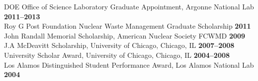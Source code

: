 \documentclass[margin,line]{resume}
\begin{document}
\begin{resume}
                DOE Office of Science Laboratory Graduate Appointment, Argonne National Lab   \hfill \textbf{2011--2013}\vspace{.5mm}\\%
                Roy G  Post Foundation Nuclear Waste Management Graduate Scholarship                \hfill \textbf{2011}\vspace{.5mm}\\%
                John Randall Memorial Scholarship, American Nuclear Society FCWMD                   \hfill \textbf{2009}\vspace{.5mm}\\%
                J.A  McDeavitt Scholarship, University of Chicago, Chicago, IL                 \hfill\textbf{2007--2008}\vspace{.5mm}\\%
                University Scholar Award, University of Chicago, Chicago, IL                   \hfill\textbf{2004--2008}\vspace{.5mm}\\%
                Los Alamos Distinguished Student Performance Award, Los Alamos National Lab                         \hfill\textbf{2004}%

\end{resume}
\end{document}
